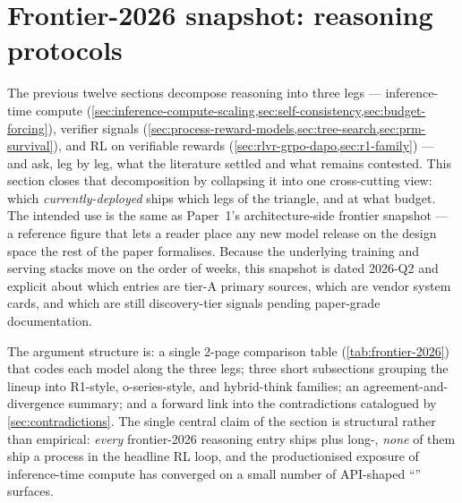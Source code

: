 
\section{Frontier-2026 snapshot: reasoning protocols}
\label{sec:frontier-2026}
\label{sec:frontier-snapshot}

The previous twelve sections decompose reasoning into three legs ---
inference-time compute (\cref{sec:inference-compute-scaling,sec:self-consistency,sec:budget-forcing}), verifier signals
(\cref{sec:process-reward-models,sec:tree-search,sec:prm-survival}), and
RL on verifiable rewards
(\cref{sec:rlvr-grpo-dapo,sec:r1-family}) --- and ask, leg by leg, what
the literature settled and what remains contested. This section closes
that decomposition by collapsing it into one cross-cutting view: which
\emph{currently-deployed}  ships which legs of the
triangle, and at what budget. The intended use is the same as Paper~1's
architecture-side frontier snapshot --- a reference figure that lets a
reader place any new model release on the design space the rest of the
paper formalises. Because the underlying training and serving stacks
move on the order of weeks, this snapshot is dated 2026-Q2 and explicit
about which entries are tier-A primary sources, which are vendor system
cards, and which are still discovery-tier signals pending paper-grade
documentation.

The argument structure is: a single 2-page comparison table
(\cref{tab:frontier-2026}) that codes each model along the three legs;
three short subsections grouping the lineup into R1-style, o-series-style,
and hybrid-think families; an agreement-and-divergence summary; and a
forward link into the contradictions catalogued by \cref{sec:contradictions}.
The single central claim of the section is structural rather than
empirical: \emph{every} frontier-2026 reasoning entry ships  plus
long-, \emph{none} of them ship a process  in the headline
RL loop, and the productionised exposure of inference-time compute has
converged on a small number of API-shaped ``'' surfaces.

